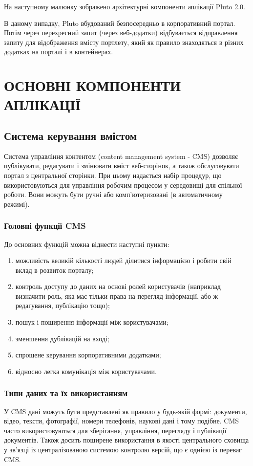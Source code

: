 На наступному малюнку зображено архітектурні компоненти аплікації Pluto 2.0. 
\par В даному випадку, Pluto вбудований безпосередньо в корпоративний портал. 
Потім через перехресний запит (через веб-додатки) відбувається відправлення запиту для відображення вмісту портлету, який як правило знаходяться в різних додатках на порталі і в контейнерах. 

\section{ОСНОВНІ КОМПОНЕНТИ АПЛІКАЦІЇ}



\subsection{Система керування вмістом}
Система управління контентом (content management system - CMS) дозволяє публікувати, редагувати і змінювати вміст веб-сторінок, а також обслуговувати портал з центральної сторінки. 
При цьому надається набір процедур, що використовуються для управління робочим процесом у середовищі для спільної роботи.
Вони можуть бути ручні або комп'ютеризовані (в автоматичному режимі).
\subsubsection{Головні функції CMS}
До основних функцій можна віднести наступні пункти:
\begin{enumerate}
\item можливість великій кількості людей ділитися інформацією і робити свій вклад в розвиток порталу;
\item контроль доступу до даних на основі ролей користувачів (наприклад визначити роль, яка має тільки права на перегляд інформації, або ж редагування, публікацію тощо);
\item пошук і поширення інформації між користувачами;
\item зменшення дублікацій на вході;
\item спрощене керування корпоративними додатками;
\item відносно легка комунікація між користувачами.
\end{enumerate}

\subsubsection{Типи даних та їх використанням}
У CMS дані можуть бути представлені як правило у будь-якій формі: документи, відео, тексти, фотографії, номери телефонів, наукові дані і тому подібне. 
CMS часто використовуються для зберігання, управління, перегляду і публікації документів. 
Також досить поширене використання в якості центрального сховища у зв'язці із централізованою системою контролю версій, що є однією із переваг CMS.
